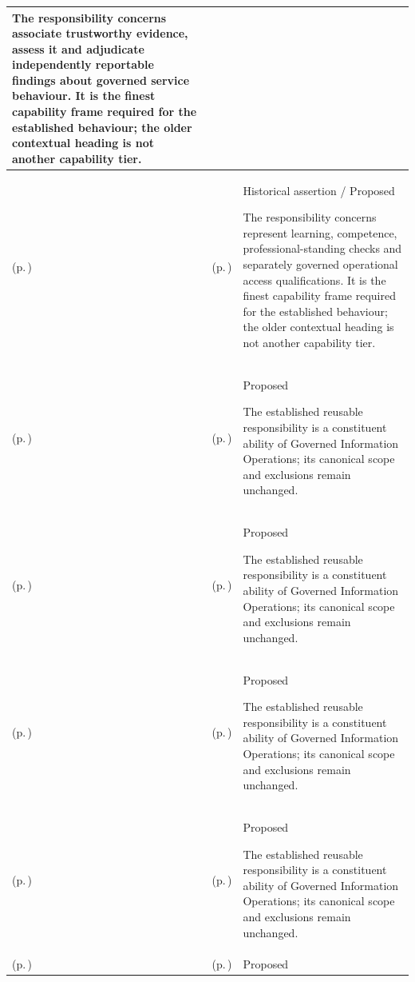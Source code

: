 \begin{longtable}{|>{\raggedright\arraybackslash}p{0.27\TableWidth}|>{\raggedright\arraybackslash}p{0.27\TableWidth}|>{\raggedright\arraybackslash}p{0.46\TableWidth}|}
The responsibility concerns associate trustworthy evidence, assess it and adjudicate independently reportable findings about governed service behaviour. It is the finest capability frame required for the established behaviour; the older contextual heading is not another capability tier.\\\hline
\nameref{cap:bec-workforce-qualification-development-enablement} (p.\,\pageref{cap:bec-workforce-qualification-development-enablement}) & \nameref{cap:bec-credential-management} (p.\,\pageref{cap:bec-credential-management}) & Historical assertion / Proposed

The responsibility concerns represent learning, competence, professional-standing checks and separately governed operational access qualifications. It is the finest capability frame required for the established behaviour; the older contextual heading is not another capability tier.\\\hline
\nameref{cap:ec-governed-information-operations} (p.\,\pageref{cap:ec-governed-information-operations}) & \nameref{cap:ec-01} (p.\,\pageref{cap:ec-01}) & Proposed

The established reusable responsibility is a constituent ability of Governed Information Operations; its canonical scope and exclusions remain unchanged.\\\hline
\nameref{cap:ec-governed-information-operations} (p.\,\pageref{cap:ec-governed-information-operations}) & \nameref{cap:ec-02} (p.\,\pageref{cap:ec-02}) & Proposed

The established reusable responsibility is a constituent ability of Governed Information Operations; its canonical scope and exclusions remain unchanged.\\\hline
\nameref{cap:ec-governed-information-operations} (p.\,\pageref{cap:ec-governed-information-operations}) & \nameref{cap:ec-03} (p.\,\pageref{cap:ec-03}) & Proposed

The established reusable responsibility is a constituent ability of Governed Information Operations; its canonical scope and exclusions remain unchanged.\\\hline
\nameref{cap:ec-governed-information-operations} (p.\,\pageref{cap:ec-governed-information-operations}) & \nameref{cap:ec-04} (p.\,\pageref{cap:ec-04}) & Proposed

The established reusable responsibility is a constituent ability of Governed Information Operations; its canonical scope and exclusions remain unchanged.\\\hline
\nameref{cap:ec-governed-information-operations} (p.\,\pageref{cap:ec-governed-information-operations}) & \nameref{cap:ec-05} (p.\,\pageref{cap:ec-05}) & Proposed


\end{longtable}
